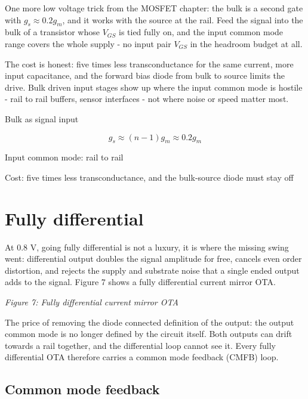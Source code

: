 One more low voltage trick from the MOSFET chapter: the bulk is a second
gate with \(g_s \approx 0.2 g_m\), and it works with the source at the
rail. Feed the signal into the bulk of a transistor whose \(V_{GS}\) is
tied fully on, and the input common mode range covers the whole supply -
no input pair \(V_{GS}\) in the headroom budget at all.

The cost is honest: five times less transconductance for the same
current, more input capacitance, and the forward bias diode from bulk to
source limits the drive. Bulk driven input stages show up where the
input common mode is hostile - rail to rail buffers, sensor interfaces -
not where noise or speed matter most.

Bulk as signal input

\[ g_{s} \approx (n-1) g_m \approx 0.2 g_m \]

Input common mode: rail to rail

Cost: five times less transconductance, and the bulk-source diode must
stay off

\section{Fully differential}\label{fully-differential}

At 0.8 V, going fully differential is not a luxury, it is where the
missing swing went: differential output doubles the signal amplitude for
free, cancels even order distortion, and rejects the supply and
substrate noise that a single ended output adds to the signal. Figure 7
shows a fully differential current mirror OTA.


{
\centering
{}
}

\emph{Figure 7: Fully differential current mirror OTA}

The price of removing the diode connected definition of the output: the
output common mode is no longer defined by the circuit itself. Both
outputs can drift towards a rail together, and the differential loop
cannot see it. Every fully differential OTA therefore carries a common
mode feedback (CMFB) loop.

\subsection{Common mode feedback}\label{common-mode-feedback}

